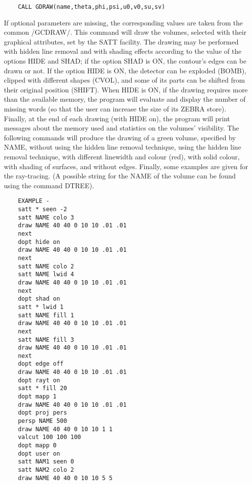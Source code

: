 \begin{verbatim}
    CALL GDRAW(name,theta,phi,psi,u0,v0,su,sv)
\end{verbatim}
   \par
If optional parameters are missing, the corresponding values are taken from 
   the common /GCDRAW/. This command will draw the volumes, selected with 
   their graphical attributes, set by the SATT facility. The drawing may be 
   performed with hidden line removal and with shading effects according to 
   the value of the options HIDE and SHAD; if the option SHAD is ON, the 
   contour's edges can be drawn or not. If the option HIDE is ON, the detector 
   can be exploded (BOMB), clipped with different shapes (CVOL), and some of 
   its parts can be shifted from their original position (SHIFT). When HIDE is 
   ON, if the drawing requires more than the available memory, the program 
   will evaluate and display the number of missing words (so that the user can 
   increase the size of its ZEBRA store). Finally, at the end of each drawing 
   (with HIDE on), the program will print messages about the memory used and 
   statistics on the volumes' visibility.  The following commands will produce 
   the drawing of a green volume, specified by NAME, without using the hidden 
   line removal technique, using the hidden line removal technique, with 
   different linewidth and colour (red), with solid colour, with shading of 
   surfaces, and without edges.  Finally, some examples are given for the 
   ray-tracing. (A possible string for the NAME of the volume can be found 
   using the command DTREE).  
\begin{verbatim}
    EXAMPLE -
    satt * seen -2
    satt NAME colo 3
    draw NAME 40 40 0 10 10 .01 .01
    next
    dopt hide on
    draw NAME 40 40 0 10 10 .01 .01
    next
    satt NAME colo 2
    satt NAME lwid 4
    draw NAME 40 40 0 10 10 .01 .01
    next
    dopt shad on
    satt * lwid 1
    satt NAME fill 1
    draw NAME 40 40 0 10 10 .01 .01
    next
    satt NAME fill 3
    draw NAME 40 40 0 10 10 .01 .01
    next
    dopt edge off
    draw NAME 40 40 0 10 10 .01 .01
    dopt rayt on
    satt * fill 20
    dopt mapp 1
    draw NAME 40 40 0 10 10 .01 .01
    dopt proj pers
    persp NAME 500
    draw NAME 40 40 0 10 10 1 1
    valcut 100 100 100
    dopt mapp 0
    dopt user on
    satt NAM1 seen 0
    satt NAM2 colo 2
    draw NAME 40 40 0 10 10 5 5
\end{verbatim}

\ENDCBIG



